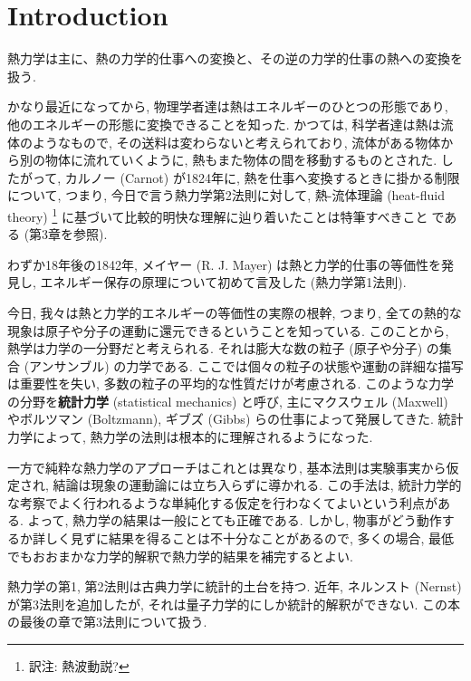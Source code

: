 \chapter{Introduction}
熱力学は主に、熱の力学的仕事への変換と、その逆の力学的仕事の熱への変換を扱う. \par
かなり最近になってから, 物理学者達は熱はエネルギーのひとつの形態であり, 他のエネルギーの形態に変換できることを知った. かつては, 科学者達は熱は流体のようなもので, その送料は変わらないと考えられており, 流体がある物体から別の物体に流れていくように, 熱もまた物体の間を移動するものとされた. したがって, カルノー (Carnot) が1824年に, 熱を仕事へ変換するときに掛かる制限について, つまり, 今日で言う熱力学第2法則に対して, 熱-流体理論 (heat-fluid theory) \footnote{訳注: 熱波動説?} に基づいて比較的明快な理解に辿り着いたことは特筆すべきことである (第3章を参照). \par
わずか18年後の1842年, メイヤー (R. J. Mayer) は熱と力学的仕事の等価性を発見し, エネルギー保存の原理について初めて言及した (熱力学第1法則). \par
今日, 我々は熱と力学的エネルギーの等価性の実際の根幹, つまり, 全ての熱的な現象は原子や分子の運動に還元できるということを知っている. このことから, 熱学は力学の一分野だと考えられる. それは膨大な数の粒子 (原子や分子) の集合 (アンサンブル) の力学である. ここでは個々の粒子の状態や運動の詳細な描写は重要性を失い, 多数の粒子の平均的な性質だけが考慮される. このような力学の分野を\textbf{統計力学} (statistical mechanics) と呼び, 主にマクスウェル (Maxwell) やボルツマン (Boltzmann), ギブズ (Gibbs) らの仕事によって発展してきた. 統計力学によって, 熱力学の法則は根本的に理解されるようになった. \par
一方で純粋な熱力学のアプローチはこれとは異なり, 基本法則は実験事実から仮定され, 結論は現象の運動論には立ち入らずに導かれる. この手法は, 統計力学的な考察でよく行われるような単純化する仮定を行わなくてよいという利点がある. よって, 熱力学の結果は一般にとても正確である. しかし, 物事がどう動作するか詳しく見ずに結果を得ることは不十分なことがあるので, 多くの場合, 最低でもおおまかな力学的解釈で熱力学的結果を補完するとよい. \par
熱力学の第1, 第2法則は古典力学に統計的土台を持つ. 近年, ネルンスト (Nernst) が第3法則を追加したが, それは量子力学的にしか統計的解釈ができない. この本の最後の章で第3法則について扱う. 

